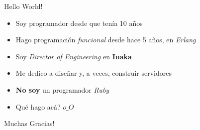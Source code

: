 \documentclass[utf8,hyperref={colorlinks=true}]{beamer}
\begin{document}

\frame{\titlepage}

\begin{frame}{Hello World!}
	\begin{itemize}
		\item<1> Soy programador desde que ten\'ia 10 a\~nos
		\item<2> Hago programaci\'on \emph{funcional} desde hace 5 a\~nos, en \emph{Erlang}
		\item<3> Soy \emph{Director of Engineering} en \textbf{Inaka}
		\item<4> Me dedico a dise\~nar y, a veces, construir servidores
		\item<5> \textbf{No soy} un programador \emph{Ruby}
		\item<6> Qu\'e hago ac\'a? \(o\_O\)
	\end{itemize}
\end{frame}

\appendix

\begin{frame}
	\begin{center}
		{\Huge Muchas Gracias!}
	\end{center}
\end{frame}
\end{document}
